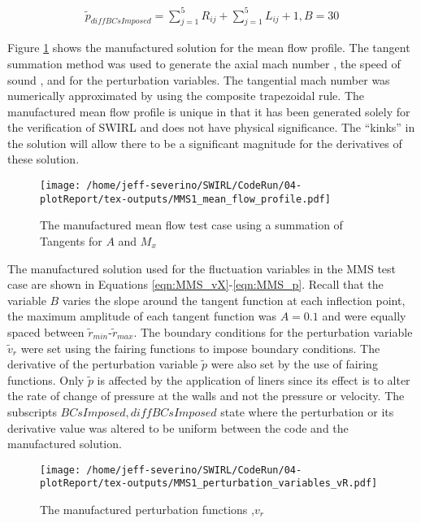 \begin{align}
    \tilde{p}_{diffBCsImposed} = 
    \sum_{j=1}^5 R_{ij} +
    \sum_{j=1}^5 L_{ij} + 1
    , B = 30 
    \label{eqn:MMS_p}
\end{align}

Figure \ref{fig:1} shows the manufactured solution for the mean flow profile. 
The tangent summation method was used to generate the axial mach number , 
the speed of sound , and for the perturbation variables.  The tangential mach number was 
numerically approximated by using the composite trapezoidal rule. 
The manufactured mean flow profile is unique in that it has been generated 
solely for the verification of SWIRL and does not have physical significance. 
The ``kinks'' in the solution will allow there to be a significant magnitude 
for the derivatives of these solution. 

\begin{figure}[!]
    \centering
    \texttt{[image: /home/jeff-severino/SWIRL/CodeRun/04-plotReport/tex-outputs/MMS1\_mean\_flow\_profile.pdf]}
    \caption{The manufactured mean flow test case using a summation of Tangents for $A$ and $M_x$}
    \label{fig:1}
\end{figure}

The manufactured solution used for the fluctuation variables in the  MMS test case are shown in 
Equations \ref{eqn:MMS_vX}-\ref{eqn:MMS_p}.  Recall that the variable $B$ 
varies the slope around the tangent function at each inflection point, the 
maximum amplitude of each tangent function was $A=0.1$ and were equally spaced 
between $\tilde{r}_{min}$-$\tilde{r}_{max}$. The boundary
conditions for the perturbation variable $\tilde{v}_r$ were set using the 
fairing functions to impose boundary conditions. The derivative of the perturbation 
variable $\tilde{p}$ were also set by the use of fairing functions. Only $\tilde{p}$
is affected by the application of liners since its effect is to alter the rate
of change of pressure at the walls and not the pressure or velocity.
The subscripts $BCsImposed,diffBCsImposed$ state where the perturbation or its derivative 
value was altered to be uniform between the code and the manufactured solution.


\begin{figure}[!]
    \centering
    \texttt{[image: /home/jeff-severino/SWIRL/CodeRun/04-plotReport/tex-outputs/MMS1\_perturbation\_variables\_vR.pdf]}
\caption{The manufactured perturbation functions ,$v_r$}%
    \label{fig:1a}
\end{figure}


